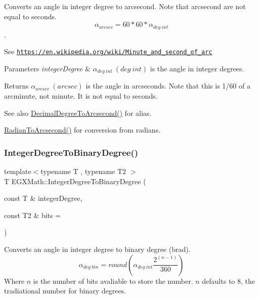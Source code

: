 Converts an angle in integer degree to arcsecond. Note that arcsecond are not equal to seconds. \[\alpha_{arcsec}=60 * 60 * \alpha_{deg\ int}\]. 

See \href{https://en.wikipedia.org/wiki/Minute_and_second_of_arc}{\tt https\+://en.\+wikipedia.\+org/wiki/\+Minute\+\_\+and\+\_\+second\+\_\+of\+\_\+arc} 
\begin{DoxyParams}{Parameters}
{\em integer\+Degree} & $\alpha_{deg\ int}\ (deg\ int)$ is the angle in integer degrees. \\
\hline
\end{DoxyParams}
\begin{DoxyReturn}{Returns}
$\alpha_{arcsec}\ (arcsec)$ is the angle in arcseconds. Note that this is 1/60 of a arcminute, not minute. It is not equal to seconds. 
\end{DoxyReturn}
\begin{DoxySeeAlso}{See also}
\mbox{\hyperlink{group___e_g_x_math-_angle_conversions-_decimal_degree_gab9d5635a6e35127b5245978aba508962}{Decimal\+Degree\+To\+Arcsecond()}} for alias. 

\mbox{\hyperlink{group___e_g_x_math-_angle_conversions-_radian_ga2f952f6675a0fc54bf72bfe4e3d2664a}{Radian\+To\+Arcsecond()}} for conversion from radians. 
\end{DoxySeeAlso}
\mbox{\label{group___e_g_x_math-_angle_conversions-_integer_degree_ga694bbfe624c3c14e97ce6155ca9bc44d}} 
\subsubsection{\texorpdfstring{Integer\+Degree\+To\+Binary\+Degree()}{IntegerDegreeToBinaryDegree()}}
{\footnotesize\ttfamily template$<$typename T , typename T2 $>$ \\
T E\+G\+X\+Math\+::\+Integer\+Degree\+To\+Binary\+Degree (\begin{DoxyParamCaption}\item[{const T \&}]{integer\+Degree,  }\item[{const T2 \&}]{bits = {} }\end{DoxyParamCaption})}



Converts an angle in integer degree to binary degree (brad). \[\alpha_{deg\ bin}=round(\alpha_{deg\ int}\frac{2^(n-1)}{360})\] Where $n$ is the number of bits avaliable to store the number. $n$ defaults to 8, the tradiational number for binary degrees. 

